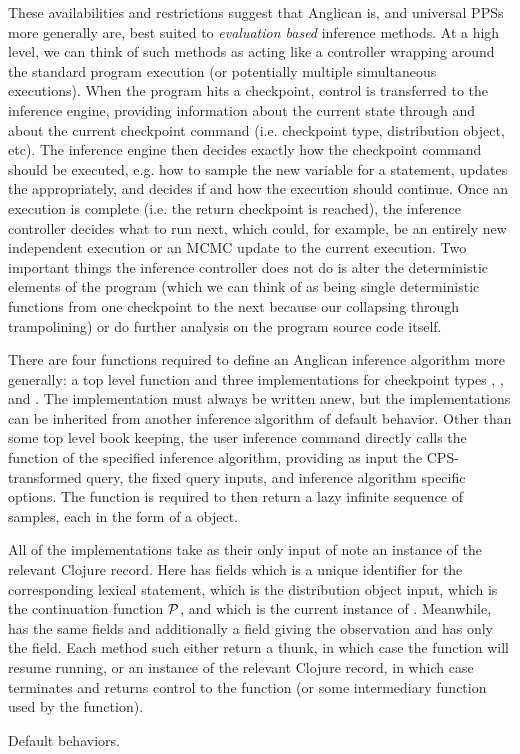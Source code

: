 These availabilities and restrictions suggest that Anglican is, and universal PPSs more generally are,
best suited to \emph{evaluation based} inference methods.  At a high level, we can think of such methods
as acting like a controller wrapping around the standard program
execution (or potentially multiple simultaneous executions).  When the program hits a checkpoint,
control is transferred to the inference engine, providing information about the current state through
\angstate and about the current checkpoint command (i.e. checkpoint type, distribution object, etc).
The inference engine then decides exactly how the checkpoint command should be executed, e.g. how to
sample the new variable for a \sample statement, updates the \angstate appropriately, and decides if
and how the execution should continue.  Once an execution is complete (i.e. the return checkpoint
is reached), the inference controller decides what to run next, which could, for example, be an entirely new independent
execution or an MCMC update to the current execution.  Two important things the inference controller
does not do is alter the deterministic elements of the program (which we can think of as being single
deterministic functions from one checkpoint to the next because our collapsing through trampolining)
or do further analysis on the program source code itself.  

There are four functions required to define an Anglican inference algorithm more generally: a top level 
\anginfer function and three \checkpoint implementations
for checkpoint types , , and  .  The \anginfer
implementation must always be written anew, but the \checkpoint implementations can be inherited from
another inference algorithm of default behavior.  Other than some top level book keeping, the user
inference command \doquery directly calls the \anginfer function of the specified inference algorithm, providing
as input the CPS-transformed query, the fixed query inputs, and inference algorithm specific options.
The \anginfer function is required to then return a lazy infinite sequence of samples, each in the form of
a \angstate object.

All of the \checkpoint implementations
take as their only input of note an instance of the relevant Clojure record.  Here  has
fields  which is a unique identifier for the corresponding lexical \sample statement, 
which is the distribution object input,  which is the continuation function $\mathcal{P}$, and 
which is the current instance of \angstate.  Meanwhile,  has the same fields and additionally
a  field giving the observation and  has only the  field.  Each
\checkpoint method such either return a thunk, in which case the  function will resume running,
or an instance of the relevant Clojure record, in which case  terminates and returns control to the \anginfer
function (or some intermediary function used by the \anginfer function).

Default behaviors.